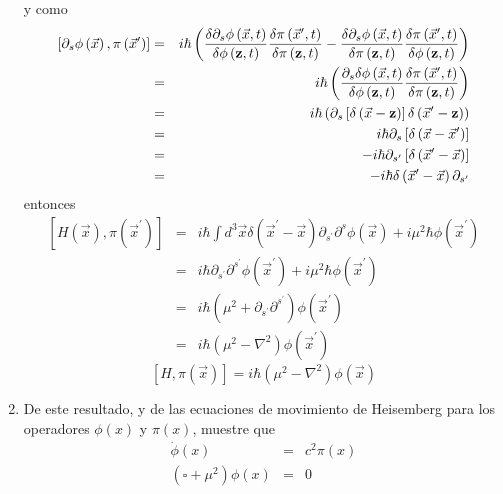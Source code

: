 \begin{enumerate}
y como
\begin{eqnarray*}
\left[ \partial _{s}\phi \left( \vec{x}\right) ,\pi \left( \vec{x}%
^{\prime }\right) \right] &=&i\hbar \left( \frac{\delta \partial _{s}\phi
\left( \vec{x},t\right) }{\delta \phi \left( {\bf z},t\right) }\frac{%
\delta \pi \left( \vec{x}^{\prime },t\right) }{\delta \pi \left( {\bf z%
},t\right) }-\frac{\delta \partial _{s}\phi \left( \vec{x},t\right) }{%
\delta \pi \left( {\bf z},t\right) }\frac{\delta \pi \left( \vec{x}%
^{\prime },t\right) }{\delta \phi \left( {\bf z},t\right) }\right) \\
&=&i\hbar \left( \frac{\partial _{s}\delta \phi \left( \vec{x},t\right) 
}{\delta \phi \left( {\bf z},t\right) }\frac{\delta \pi \left( \vec{x}%
^{\prime },t\right) }{\delta \pi \left( {\bf z},t\right) }\right) \\
&=&i\hbar \left( \partial _{s}\left[ \delta \left( \vec{x}-{\bf z}%
\right) \right] \delta \left( \vec{x}^{\prime }-{\bf z}\right) \right) 
\\
&=&i\hbar \partial _{s}\left[ \delta \left( \vec{x}-\vec{x}^{\prime
}\right) \right] \\
&=&-i\hbar \partial _{s^{\prime }}\left[ \delta \left( \vec{x}^{\prime
}-\vec{x}\right) \right] \\
&=&-i\hbar \delta \left( \vec{x}^{\prime }-\vec{x}\right) \partial
_{s^{\prime }}
\end{eqnarray*}
entonces
\begin{eqnarray*}
\left[ H\left( \vec{x}\right) ,\pi \left( \vec{x}^{\prime }\right) %
\right] &=&i\hbar \int d^{3}\vec{x}\delta \left( \vec{x}^{\prime }-%
\vec{x}\right) \partial _{s^{\prime }}\partial ^{s}\phi \left( \vec{x}%
\right) +i\mu ^{2}\hbar \phi \left( \vec{x}^{\prime }\right) \\
&=&i\hbar \partial _{s^{\prime }}\partial ^{s^{\prime }}\phi \left( 
\vec{x}^{\prime }\right) +i\mu ^{2}\hbar \phi \left( \vec{x}^{\prime
}\right) \\
&=&i\hbar \left( \mu ^{2}+\partial _{s^{\prime }}\partial ^{s^{\prime
}}\right) \phi \left( \vec{x}^{\prime }\right) \\
&=&i\hbar \left( \mu ^{2}-\nabla ^{2}\right) \phi \left( \vec{x}%
^{\prime }\right) 
\end{eqnarray*}
\begin{equation}
\left[ H,\pi \left( \vec{x}\right) \right] =i\hbar \left( \mu
^{2}-\nabla ^{2}\right) \phi \left( \vec{x}\right) 
\end{equation}

\item De este resultado, y de las ecuaciones de movimiento de Heisemberg
para los operadores $\phi (x) $ y $\pi (x) $,
muestre que
\begin{eqnarray*}
\dot{\phi}(x) &=&c^{2}\pi (x) \\
\left( \square +\mu ^{2}\right) \phi (x) &=&0
\end{eqnarray*}


\end{enumerate}
